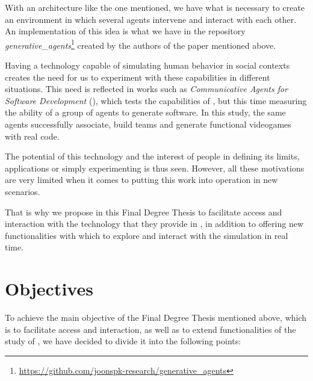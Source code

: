With an architecture like the one mentioned, we have what is necessary to create an environment in which several agents intervene and interact with each other. An implementation of this idea is what we have in the repository {\textit{generative\_agents}}\footnote{\url{https://github.com/joonspk-research/generative_agents}}  created by the authors of the paper mentioned above.

Having a technology capable of simulating human behavior in social contexts creates the need for us to experiment with these capabilities in different situations. This need is reflected in works such as \textit{Communicative Agents for Software Development}  (\cite{qian2023communicative}), which tests the capabilities of \ga, but this time measuring the ability of a group of agents to generate software. In this study, the same agents successfully associate, build teams and generate functional videogames with real code.

The potential of this technology and the interest of people in defining its limits, applications or simply experimenting is thus seen. However, all these motivations are very limited when it comes to putting this work into operation in new scenarios.

That is why we propose in this Final Degree Thesis to facilitate access and interaction with the technology that they provide in \ga, in addition to offering new functionalities with which to explore and interact with the simulation in real time.

\section{Objectives}
To achieve the main objective of the Final Degree Thesis mentioned above, which is to facilitate access and interaction, as well as to extend functionalities of the study of \ga, we have decided to divide it into the following points:

